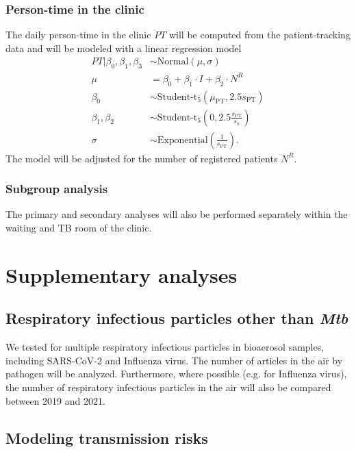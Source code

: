 \documentclass{article}
\begin{document}
\subsubsection{Person-time in the clinic} 

The daily person-time in the clinic $PT$ will be computed from the patient-tracking data and will be modeled with a linear regression model 
\begin{align*}
    PT | \beta_0, \beta_1, \beta_3 &\sim \text{Normal}(\mu, \sigma) \\
    \mu &= \beta_0 + \beta_1 \cdot I + \beta_2 \cdot N^R \\
    \beta_0 &\sim \text{Student-t}_5(\mu_{\text{PT}}, 2.5s_{\text{PT}}) \\
    \beta_1, \beta_2 &\sim \text{Student-t}_5\left(0, 2.5\frac{s_{\text{PT}}}{s_{\text{x}}}\right) \\
    \sigma &\sim \text{Exponential}\left(\frac{1}{s_{\text{PT}}}\right).
\end{align*}
The model will be adjusted for the number of registered patients $N^R$.

\subsubsection{Subgroup analysis}

The primary and secondary analyses will also be performed separately within the waiting and TB room of the clinic. 

\section{Supplementary analyses}

\subsection{Respiratory infectious particles other than \emph{Mtb}}

We tested for multiple respiratory infectious particles in bioaerosol samples, including SARS-CoV-2 and Influenza virus. The number of articles in the air by pathogen will be analyzed. Furthermore, where possible (e.g. for Influenza virus), the number of respiratory infectious particles in the air will also be compared between 2019 and 2021. 

\subsection{Modeling transmission risks}
\end{document}
